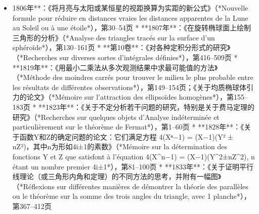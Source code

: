 \begin{itemize}
\item 1806年**：《将月亮与太阳或某恒星的视距换算为实距的新公式》（*Nouvelle formule pour réduire en distances vraies les distances apparentes de la Lune au Soleil ou à une étoile*），第30–54页
* **1807年**：《在旋转椭球面上绘制三角形的分析》（*Analyse des triangles tracés sur la surface d'un sphéroïde*），第130–161页
* **第10卷**：《对各种定积分形式的研究》（*Recherches sur diverses sortes d'intégrales définies*），第416–509页
* **1819年**：《用最小二乘法从多次观测结果中求最可能值的方法》（*Méthode des moindres carrés pour trouver le milieu le plus probable entre les résultats de différentes observations*），第149–154页；《关于均质椭球体引力的论文》（*Mémoire sur l'attraction des ellipsoïdes homogènes*），第155–183页
* **1823年**：《关于不定分析若干问题的研究，特别是关于费马定理的研究》（*Recherches sur quelques objets d'Analyse indéterminée et particulièrement sur le théorème de Fermat*），第1–60页
* **1828年**：《关于函数Y和Z的确定问题的论文：它们满足方程 4(Xⁿ−1) = (X−1)(Y² ± nZ²)，其中n为形如4i±1的素数》（*Mémoire sur la détermination des fonctions Y et Z que satisfont à l'équation 4(X^n−1) = (X−1)(Y^2±nZ^2), n étant un nombre premier 4i±1*），第81–100页
* **1833年**：《关于证明平行线理论（或三角形内角和定理）的不同方法的思考，并附有一幅图》（*Réflexions sur différentes manières de démontrer la théorie des parallèles ou le théorème sur la somme des trois angles du triangle, avec 1 planche*），第367–412页

\end{itemize}
